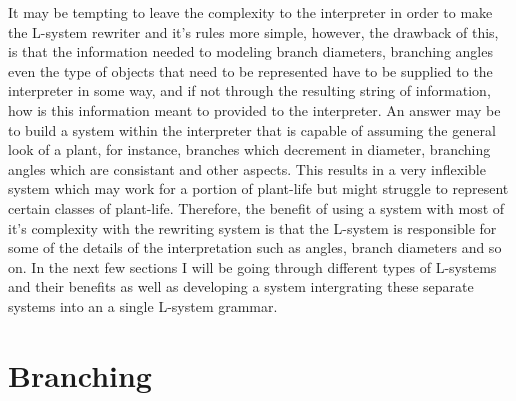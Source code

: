 \begin{flushleft}
\vspace{5mm}

It may be tempting to leave the complexity to the interpreter in order to make the L-system rewriter and it's rules more simple, however, the drawback of this, is that the information needed to modeling branch diameters, branching angles even the type of objects that need to be represented have to be supplied to the interpreter in some way, and if not through the resulting string of information, how is this information meant to provided to the interpreter. An answer may be to build a system within the interpreter that is capable of assuming the general look of a plant, for instance, branches which decrement in diameter, branching angles which are consistant and other aspects. This results in a very inflexible system which may work for a portion of plant-life but might struggle to represent certain classes of plant-life. Therefore, the benefit of using a system with most of it's complexity with the rewriting system is that the L-system is responsible for some of the details of the interpretation such as angles, branch diameters and so on. In the next few sections I will be going through different types of L-systems and their benefits as well as developing a system intergrating these separate systems into an a single L-system grammar.   

\end{flushleft}

\section{Branching} \label{branching}

